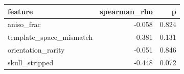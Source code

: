 \begin{tabular}{lrr}
\toprule
feature & spearman\_rho & p \\
\midrule
aniso\_frac & -0.058 & 0.824 \\
template\_space\_mismatch & -0.381 & 0.131 \\
orientation\_rarity & -0.051 & 0.846 \\
skull\_stripped & -0.448 & 0.072 \\
\bottomrule
\end{tabular}
